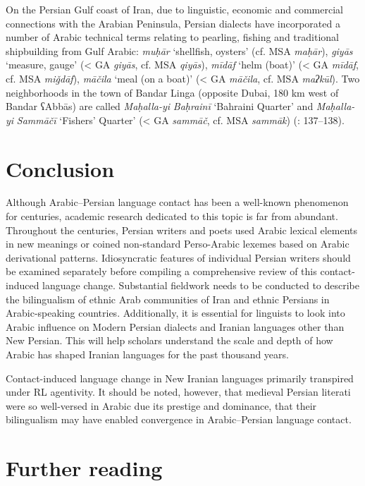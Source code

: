 \documentclass[output=paper]{langsci/langscibook}
\begin{document}
On the Persian Gulf coast of Iran, due to linguistic, economic and commercial connections with the Arabian Peninsula, Persian dialects have incorporated a number of Arabic technical terms relating to pearling, fishing and traditional shipbuilding from Gulf Arabic: \textit{muḥār} ‘shellfish, oysters’ (cf. MSA \textit{maḥār}), \textit{giyās} ‘measure, gauge’ (< GA \textit{giyās}, cf. MSA \textit{qiyās}), \textit{mīdāf} ‘helm (boat)’ (< GA \textit{mīdāf}, cf. MSA \textit{miǧdāf}), \textit{māčila} ‘meal (on a boat)’ (< GA \textit{māčila}, cf. MSA \textit{maʔkūl}). Two neighborhoods in the town of Bandar Linga (opposite Dubai, 180 km west of Bandar ʕAbbās) are called \textit{Maḥalla-yi} \textit{Baḥrainī} ‘Bahraini Quarter’ and \textit{Maḥalla-yi} \textit{Sammāčī} ‘Fishers’ Quarter’ (< GA \textit{sammāč}, cf. MSA \textit{sammāk}) (\citealt{Baḫtiyārī1990}: 137–138).

\section{Conclusion}

Although Arabic–Persian language contact has been a well-known phenomenon for centuries, academic research dedicated to this topic is far from abundant. Throughout the centuries, Persian writers and poets used Arabic lexical elements in new meanings or coined non-standard Perso-Arabic lexemes based on Arabic derivational patterns. Idiosyncratic features of individual Persian writers should be examined separately before compiling a comprehensive review of this contact-induced language change. Substantial fieldwork needs to be conducted to describe the bilingualism of ethnic Arab communities of Iran and ethnic Persians in Arabic-speaking countries. Additionally, it is essential for linguists to look into Arabic influence on Modern Persian dialects and Iranian languages other than New Persian. This will help scholars understand the scale and depth of how Arabic has shaped Iranian languages for the past thousand years.

Contact-induced language change in New Iranian languages primarily transpired under RL agentivity. It should be noted, however, that medieval Persian literati were so well-versed in Arabic due its prestige and dominance, that their bilingualism may have enabled convergence in Arabic–Persian language contact.

\section*{Further reading}
\end{document}
